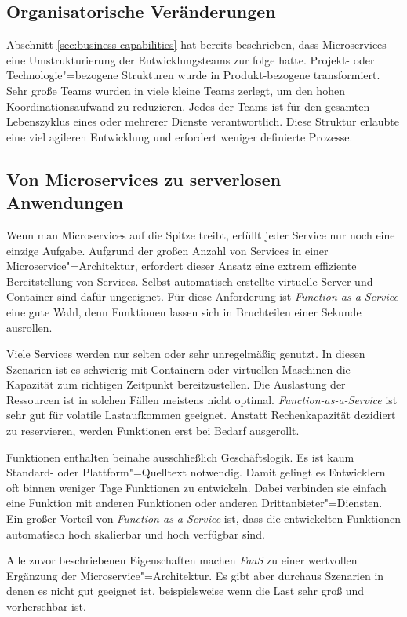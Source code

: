 \subsection{Organisatorische Veränderungen}

Abschnitt \ref{sec:business-capabilities} hat bereits beschrieben, dass Microservices eine Umstrukturierung der Entwicklungsteams zur folge hatte. Projekt- oder Technologie"=bezogene Strukturen wurde in Produkt-bezogene transformiert. Sehr große Teams wurden in viele kleine Teams zerlegt, um den hohen Koordinationsaufwand zu reduzieren. Jedes der Teams ist für den gesamten Lebenszyklus eines oder mehrerer Dienste verantwortlich. Diese Struktur erlaubte eine viel agileren Entwicklung und erfordert weniger definierte Prozesse.

\subsection{Von Microservices zu serverlosen Anwendungen}

Wenn man Microservices auf die Spitze treibt, erfüllt jeder Service nur noch eine einzige Aufgabe. Aufgrund der großen Anzahl von Services in einer Microservice"=Architektur, erfordert dieser Ansatz eine extrem effiziente Bereitstellung von Services. Selbst automatisch erstellte virtuelle Server und Container sind dafür ungeeignet. Für diese Anforderung ist \textit{Function-as-a-Service} eine gute Wahl, denn Funktionen lassen sich in Bruchteilen einer Sekunde ausrollen.

Viele Services werden nur selten oder sehr unregelmäßig genutzt. In diesen Szenarien ist es schwierig mit Containern oder virtuellen Maschinen die Kapazität zum richtigen Zeitpunkt bereitzustellen. Die Auslastung der Ressourcen ist in solchen Fällen meistens nicht optimal. \textit{Function-as-a-Service} ist sehr gut für volatile Lastaufkommen geeignet. Anstatt Rechenkapazität dezidiert zu reservieren, werden Funktionen erst bei Bedarf ausgerollt.

Funktionen enthalten beinahe ausschließlich Geschäftslogik. Es ist kaum Standard- oder Plattform"=Quelltext notwendig. Damit gelingt es Entwicklern oft binnen weniger Tage Funktionen zu entwickeln. Dabei verbinden sie einfach eine Funktion mit anderen Funktionen oder anderen Drittanbieter"=Diensten. Ein großer Vorteil von \textit{Function-as-a-Service} ist, dass die entwickelten Funktionen automatisch hoch skalierbar und hoch verfügbar sind.

Alle zuvor beschriebenen Eigenschaften machen \textit{FaaS} zu einer wertvollen Ergänzung der Microservice"=Architektur. Es gibt aber durchaus Szenarien in denen es nicht gut geeignet ist, beispielsweise wenn die Last sehr groß und vorhersehbar ist.


\iffalse
Serverless
- Intro
  - What
	- Why
	- Amazn
	- OSS
	- Competitors
- App Service Plan
- Kudu (Jobs, Deploy, Kinds, Scripts)
- Web Jobs SDK
  - Glue code
	- Locally / Dashboard
	- Core Arch
- Functions
  - Script Host Architecture
	- Dynamic Plan
	- Scaling
	- Threading
- Perf Benchmarks
- Pricing Comparison
\fi